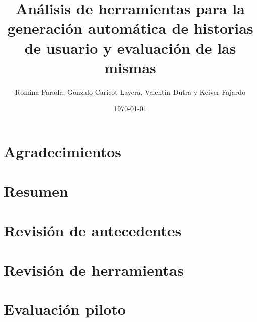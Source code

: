 \documentclass{prgrado}
\title{Análisis de herramientas para la generación automática de historias de usuario y evaluación de las mismas}
\author{Romina Parada, Gonzalo Caricot Layera, Valentin Dutra y Keiver Fajardo}
\date{\today}
\begin{document}
\setcounter{secnumdepth}{3} 

\frontmatter
\maketitle

\chapter{Agradecimientos}

\chapter{Resumen}


\tableofcontents


\mainmatter


\chapter{Revisión de antecedentes}
\label{cap:antecedentes}





\chapter{Revisión de herramientas}
\label{cap:herramientas}


\chapter{Evaluación piloto}
\label{cap:central}

\end{document}
